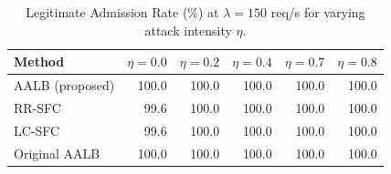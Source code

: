 \begin{table}[t]
\centering
\caption{Legitimate Admission Rate (\%) at $\lambda=150$ req/s for varying attack intensity $\eta$.}
\label{tab:admission_rate}
\begin{tabular}{lrrrrr}
\toprule
Method & $\eta=0.0$ & $\eta=0.2$ & $\eta=0.4$ & $\eta=0.7$ & $\eta=0.8$ \\
\midrule
AALB (proposed) & 100.0 & 100.0 & 100.0 & 100.0 & 100.0 \\
RR-SFC & 99.6 & 100.0 & 100.0 & 100.0 & 100.0 \\
LC-SFC & 99.6 & 100.0 & 100.0 & 100.0 & 100.0 \\
Original AALB & 100.0 & 100.0 & 100.0 & 100.0 & 100.0 \\
\bottomrule
\end{tabular}
\end{table}